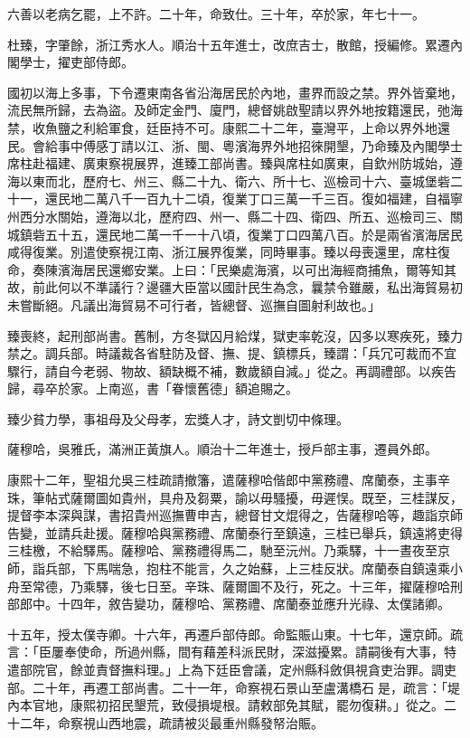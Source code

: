 \begin{pinyinscope}
六善以老病乞罷，上不許。二十年，命致仕。三十年，卒於家，年七十一。

杜臻，字肇餘，浙江秀水人。順治十五年進士，改庶吉士，散館，授編修。累遷內閣學士，擢吏部侍郎。

國初以海上多事，下令遷東南各省沿海居民於內地，畫界而設之禁。界外皆棄地，流民無所歸，去為盜。及師定金門、廈門，總督姚啟聖請以界外地按籍還民，弛海禁，收魚鹽之利給軍食，廷臣持不可。康熙二十二年，臺灣平，上命以界外地還民。會給事中傅感丁請以江、浙、閩、粵濱海界外地招徠開墾，乃命臻及內閣學士席柱赴福建、廣東察視展界，進臻工部尚書。臻與席柱如廣東，自欽州防城始，遵海以東而北，歷府七、州三、縣二十九、衛六、所十七、巡檢司十六、臺城堡砦二十一，還民地二萬八千一百九十二頃，復業丁口三萬一千三百。復如福建，自福寧州西分水關始，遵海以北，歷府四、州一、縣二十四、衛四、所五、巡檢司三、關城鎮砦五十五，還民地二萬一千一十八頃，復業丁口四萬八百。於是兩省濱海居民咸得復業。別遣使察視江南、浙江展界復業，同時畢事。臻以母喪還里，席柱復命，奏陳濱海居民還鄉安業。上曰：「民樂處海濱，以可出海經商捕魚，爾等知其故，前此何以不準議行？邊疆大臣當以國計民生為念，曩禁令雖嚴，私出海貿易初未嘗斷絕。凡議出海貿易不可行者，皆總督、巡撫自圖射利故也。」

臻喪終，起刑部尚書。舊制，方冬獄囚月給煤，獄吏率乾沒，囚多以寒疾死，臻力禁之。調兵部。時議裁各省駐防及督、撫、提、鎮標兵，臻謂：「兵冗可裁而不宜驟行，請自今老弱、物故、額缺概不補，數歲額自減。」從之。再調禮部。以疾告歸，尋卒於家。上南巡，書「眷懷舊德」額追賜之。

臻少貧力學，事祖母及父母孝，宏獎人才，詩文剴切中條理。

薩穆哈，吳雅氏，滿洲正黃旗人。順治十二年進士，授戶部主事，遷員外郎。

康熙十二年，聖祖允吳三桂疏請撤籓，遣薩穆哈偕郎中黨務禮、席蘭泰，主事辛珠，筆帖式薩爾圖如貴州，具舟及芻粟，諭以毋騷擾，毋遲悮。既至，三桂謀反，提督李本深與謀，書招貴州巡撫曹申吉，總督甘文焜得之，告薩穆哈等，趣詣京師告變，並請兵赴援。薩穆哈與黨務禮、席蘭泰行至鎮遠，三桂已舉兵，鎮遠將吏得三桂檄，不給驛馬。薩穆哈、黨務禮得馬二，馳至沅州。乃乘驛，十一晝夜至京師，詣兵部，下馬喘急，抱柱不能言，久之始蘇，上三桂反狀。席蘭泰自鎮遠乘小舟至常德，乃乘驛，後七日至。辛珠、薩爾圖不及行，死之。十三年，擢薩穆哈刑部郎中。十四年，敘告變功，薩穆哈、黨務禮、席蘭泰並應升光祿、太僕諸卿。

十五年，授太僕寺卿。十六年，再遷戶部侍郎。命監賑山東。十七年，還京師。疏言：「臣屢奉使命，所過州縣，間有藉差科派民財，深滋擾累。請嗣後有大事，特遣部院官，餘並責督撫料理。」上為下廷臣會議，定州縣科斂俱視貪吏治罪。調吏部。二十年，再遷工部尚書。二十一年，命察視石景山至盧溝橋石是，疏言：「堤內本官地，康熙初招民墾荒，致侵損堤根。請敕部免其賦，罷勿復耕。」從之。二十二年，命察視山西地震，疏請被災最重州縣發帑治賑。


\end{pinyinscope}
